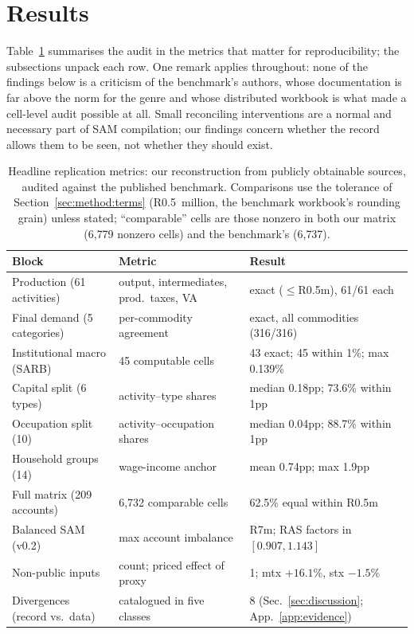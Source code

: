\section{Results}\label{sec:results}

Table~\ref{tab:headline} summarises the audit in the metrics that matter
for reproducibility; the subsections unpack each row. One remark applies
throughout: none of the findings below is a criticism of the benchmark's
authors, whose documentation is far above the norm for the genre and whose
distributed workbook is what made a cell-level audit possible at all. Small
reconciling interventions are a normal and necessary part of SAM
compilation; our findings concern whether the record allows them to be
seen, not whether they should exist.

\begin{table}[t]
\centering\small
\caption{Headline replication metrics: our reconstruction from
publicly obtainable sources, audited against the published benchmark.
Comparisons use the tolerance of Section~\ref{sec:method:terms}
(R0.5~million, the benchmark workbook's rounding grain) unless stated;
``comparable'' cells are those nonzero in both our matrix (6{,}779
nonzero cells) and the benchmark's (6{,}737).}
\label{tab:headline}
\begin{tabularx}{\textwidth}{lXl}
\toprule
Block & Metric & Result \\
\midrule
Production (61 activities) & output, intermediates, prod.\ taxes, VA & exact ($\le$R0.5m), 61/61 each \\
Final demand (5 categories) & per-commodity agreement & exact, all commodities (316/316) \\
Institutional macro (SARB) & 45 computable cells & 43 exact; 45 within 1\%; max 0.139\% \\
Capital split (6 types) & activity--type shares & median 0.18pp; 73.6\% within 1pp \\
Occupation split (10) & activity--occupation shares & median 0.04pp; 88.7\% within 1pp \\
Household groups (14) & wage-income anchor & mean 0.74pp; max 1.9pp \\
Full matrix (209 accounts) & 6{,}732 comparable cells & 62.5\% equal within R0.5m \\
Balanced SAM (v0.2) & max account imbalance & R7m; RAS factors in $[0.907, 1.143]$ \\
\midrule
Non-public inputs & count; priced effect of proxy & 1; mtx $+16.1$\%, stx $-1.5$\% \\
Divergences (record vs.\ data) & catalogued in five classes & 8 (Sec.~\ref{sec:discussion}; App.~\ref{app:evidence}) \\
\bottomrule
\end{tabularx}
\end{table}

